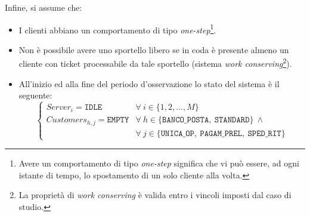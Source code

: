 Infine, si assume che:
\begin{itemize}
\item I clienti abbiano un comportamento di tipo \textsl{one-step}\footnote{Avere un comportamento di tipo \textsl{one-step} significa che vi può essere, ad ogni istante di tempo, lo spostamento di un solo cliente alla volta.}.
\item Non è possibile avere uno sportello libero se in coda è presente almeno un cliente con ticket processabile da tale sportello (sistema \textsl{work conserving}\footnote{La proprietà di \textsl{work conserving} è valida entro i vincoli imposti dal caso di studio.}).
\item All'inizio ed alla fine del periodo d'osservazione lo stato del sistema è il seguente:
\begin{equation}
\begin{cases}
Server_i =\mathtt{IDLE} & \forall\ i \in \lbrace 1, 2, \dots, M \rbrace \\[1em]
Customers_{h,j} = \mathtt{EMPTY} & \forall\ h \in \lbrace \mathtt{BANCO\_POSTA},\ \mathtt{STANDARD}\rbrace\ \wedge \\
& \forall\ j \in \lbrace \mathtt{UNICA\_OP},\ \mathtt{PAGAM\_PREL},\ \mathtt{SPED\_RIT} \rbrace
\end{cases}
\end{equation}
\end{itemize}



